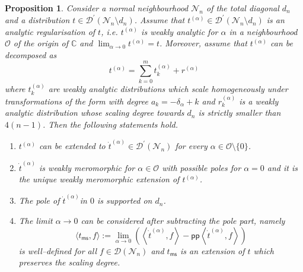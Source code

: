 \documentclass[10pt]{book}
\newcommand{\pp}{\mathsf{pp}}
\newcommand{\ms}{\mathsf{ms}}
\newcommand{\Dcal}{\mathcal{D}}
\newcommand{\Ncal}{\mathcal{N}}
\newcommand{\Ocal}{\mathcal{O}}
\theoremstyle{break}
\newtheorem{proposition}{Proposition}
\begin{document}
\begin{proposition}
Consider a normal neighbourhood $\Ncal_n$ of the total diagonal $d_n$ and a distribution $t\in\Dcal^\prime(\Ncal_n\setminus d_n)$. Assume that $t^{(\alpha)}\in\Dcal^\prime(\Ncal_n\setminus d_n)$ is an analytic regularisation of $t$, i.e. $t^{(\alpha)}$ is weakly analytic for $\alpha$ in a neighbourhood $\Ocal$ of the origin of $\mathbb{C}$ and $\lim_{\alpha\to 0}t^{(\alpha)}=t$. Moreover, assume that $t^{(\alpha)}$ can be decomposed as 
\[
t^{(\alpha)} = \sum_{k=0}^m t^{(\alpha)}_k    + r^{(\alpha)}
\]
where $t^{(\alpha)}_k$ are weakly analytic distributions which scale homogeneously under transformations of the form %
with degree $a_k = -\delta_\alpha + k$ and $r^{(\alpha)}_k$ is a weakly analytic distribution whose scaling degree towards $d_n$ is strictly smaller than $4(n-1)$. Then the following statements hold.
\begin{enumerate}
\item $t^{(\alpha)}$ can be extended to $\dot{t}^{(\alpha)}\in \Dcal^\prime(\Ncal_n)$ for every $\alpha\in \Ocal\setminus\{0\}$.
\item $\dot{t}^{(\alpha)}$ is weakly meromorphic for $\alpha\in\Ocal$ with possible poles for $\alpha=0$ and it is the unique weakly meromorphic extension of $t^{(\alpha)}$. 
\item The pole of $\dot{t}^{(\alpha)}$in $0$ is supported on $d_n$.
\item The limit $\alpha\to 0$ can be considered after subtracting the pole part, namely
\[
\langle t_\ms, f \rangle:= \lim_{\alpha\to 0 } \left(\left\langle \dot{t}^{(\alpha)}, f \right\rangle - \pp \left\langle \dot{t}^{(\alpha)}, f \right\rangle  \right)
\]
is well--defined for all $f\in\Dcal(\Ncal_n)$ and $t_\ms$ is an extension of $t$ which preserves the scaling degree.
\end{enumerate}
\end{proposition}
\end{document}
